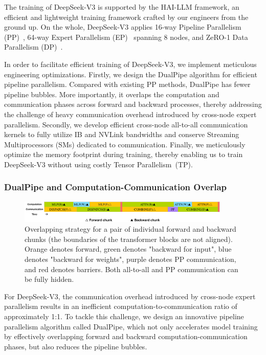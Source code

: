 \documentclass[11pt, a4paper, logo, copyright, nonumbering]{deepseek}
\newcommand{\dsviii}{DeepSeek-V3}
\begin{document}
\begin{CJK*}{UTF8}{gbsn}
The training of \dsviii{} is supported by the HAI-LLM framework, an efficient and lightweight training framework crafted by our engineers from the ground up. 
On the whole, \dsviii{} applies 16-way Pipeline Parallelism (PP)~\citep{qi2023zero}, 64-way Expert Parallelism (EP)~\citep{gshard} spanning 8 nodes, and ZeRO-1 Data Parallelism (DP)~\citep{zero}. 

In order to facilitate efficient training of \dsviii{}, we implement meticulous engineering optimizations.
Firstly, we design the DualPipe algorithm for efficient pipeline parallelism.
Compared with existing PP methods, DualPipe has fewer pipeline bubbles. 
More importantly, it overlaps the computation and communication phases across forward and backward processes, thereby addressing the challenge of heavy communication overhead introduced by cross-node expert parallelism. 
Secondly, we develop efficient cross-node all-to-all communication kernels to fully utilize IB and NVLink bandwidths and conserve Streaming Multiprocessors (SMs) dedicated to communication. 
Finally, we meticulously optimize the memory footprint during training, thereby enabling us to train \dsviii{} without using costly Tensor Parallelism~(TP).

\subsubsection{DualPipe and Computation-Communication Overlap}

\begin{figure}[t]
    \centering
    \includegraphics[width=0.9\textwidth]{figures/overlap.pdf}
    \caption{
        Overlapping strategy for a pair of individual forward and backward chunks (the boundaries of the transformer blocks are not aligned). 
        Orange denotes forward, green denotes "backward for input", blue denotes "backward for weights", purple denotes PP communication, and red denotes barriers.
        Both all-to-all and PP communication can be fully hidden. 
    }
    \label{fig:transformer-overlap}
\end{figure}

For \dsviii{}, the communication overhead introduced by cross-node expert parallelism results in an inefficient computation-to-communication ratio of approximately 1:1. 
To tackle this challenge, we design an innovative pipeline parallelism algorithm called DualPipe, which not only accelerates model training by effectively overlapping forward and backward computation-communication phases, but also reduces the pipeline bubbles.


\end{CJK*}
\end{document}
